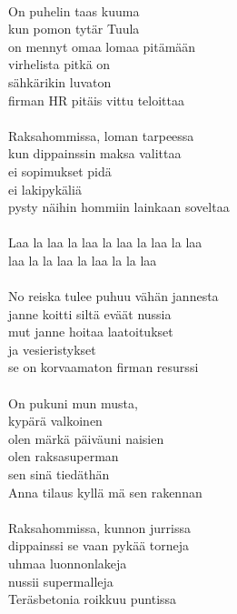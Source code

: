\hspace{10mm} \\
            On puhelin taas kuuma \\
            kun pomon tytär Tuula \\
            on mennyt omaa lomaa pitämään \\
            virhelista pitkä on \\
            sähkärikin luvaton \\
            firman HR pitäis vittu teloittaa \\
\hspace{10mm} \\
            Raksahommissa, loman tarpeessa \\
            kun dippainssin maksa valittaa \\
            ei sopimukset pidä \\
            ei lakipykäliä \\
            pysty näihin hommiin lainkaan soveltaa \\
\hspace{10mm} \\
            Laa la laa la laa la laa la laa la laa \\
            laa la la laa la laa la la laa \\
\hspace{10mm} \\
            No reiska tulee puhuu vähän jannesta \\
            janne koitti siltä eväät nussia \\
            mut janne hoitaa laatoitukset \\
            ja vesieristykset \\
            se on korvaamaton firman resurssi \\
\hspace{10mm} \\
            On pukuni mun musta, \\
            kypärä valkoinen \\
            olen märkä päiväuni naisien \\
            olen raksasuperman \\
            sen sinä tiedäthän \\
            Anna tilaus kyllä mä sen rakennan \\
\hspace{10mm} \\
            Raksahommissa, kunnon jurrissa \\
            dippainssi se vaan pykää torneja \\
            uhmaa luonnonlakeja \\
            nussii supermalleja \\
            Teräsbetonia roikkuu puntissa \\
